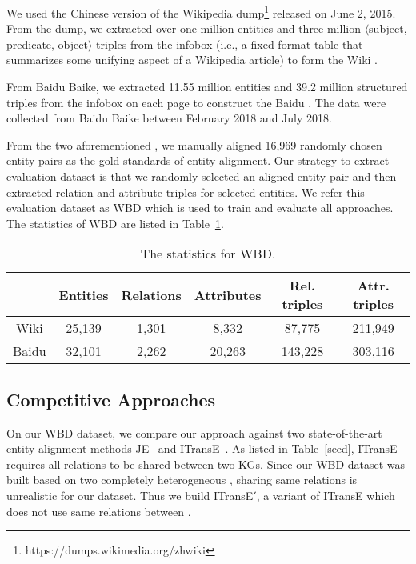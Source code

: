 	We used the Chinese version of the Wikipedia dump\footnote{https://dumps.wikimedia.org/zhwiki} released on June 2, 2015.
    From the dump, we extracted over one million entities and three million $\langle$subject, predicate, object$\rangle$ triples from the infobox (i.e., a fixed-format table that summarizes some unifying aspect of a Wikipedia article) to form the Wiki \KG.
	
	 From Baidu Baike, we extracted 11.55 million entities and 39.2 million structured triples from the infobox on each page to construct the Baidu \KG.
	The data were collected from Baidu Baike between February 2018 and July 2018.
	
	 From the two aforementioned \KGs, we manually aligned 16,969 randomly chosen entity pairs as the gold standards of entity alignment.
	Our strategy to extract evaluation dataset is that we randomly selected an aligned entity pair and then extracted relation and attribute triples for selected entities.
	We refer this evaluation dataset as WBD which is used to train and evaluate all approaches. The statistics of WBD are listed in Table~\ref{dataset}.
	




	\begin{table}
	\centering
	\scriptsize
	\begin{tabular}{c|ccccc}
		\toprule
		&\bf  Entities &\bf  Relations &\bf  Attributes &\bf  Rel. triples &\bf  Attr. triples \\
		\midrule
		Wiki & 25,139 & 1,301 & 8,332 & 87,775 & 211,949 \\
		Baidu & 32,101 & 2,262 & 20,263 & 143,228 & 303,116 \\
		\bottomrule
	\end{tabular}
	\caption{The statistics for WBD.}
	\label{dataset}
\end{table}


	\subsection{Competitive Approaches}
	On our WBD dataset, we compare our approach against two state-of-the-art entity alignment methods JE~\cite{hao2016joint} and
ITransE~\cite{zhu2017iterative}. As listed in Table~\ref{seed}, ITransE requires all relations to be shared between two KGs. Since our WBD
dataset was built based on two completely heterogeneous \KGs, sharing same relations is unrealistic for our dataset. Thus we build
ITransE$'$, a variant of ITransE which does not use same relations between \KGs. 	




